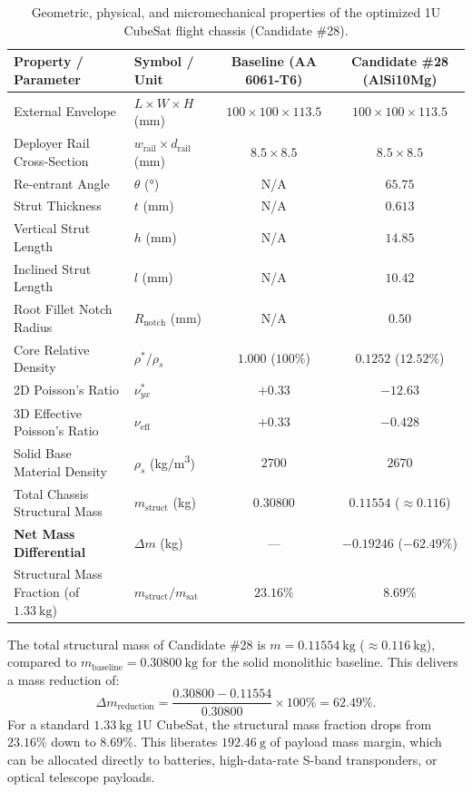 \begin{table}[htbp]
\centering
\caption{Geometric, physical, and micromechanical properties of the optimized 1U CubeSat flight chassis (Candidate \#28).}
\label{tab:candidate28_parameters}
\scriptsize
\setlength{\tabcolsep}{4pt}
\begin{tabularx}{\textwidth}{l l c c}
\toprule
\textbf{Property / Parameter} & \textbf{Symbol / Unit} & \textbf{Baseline (AA 6061-T6)} & \textbf{Candidate \#28 (AlSi10Mg)} \\
\midrule
External Envelope & $L \times W \times H$ (\si{\milli\meter}) & $100 \times 100 \times 113.5$ & $100 \times 100 \times 113.5$ \\
Deployer Rail Cross-Section & $w_{\text{rail}} \times d_{\text{rail}}$ (\si{\milli\meter}) & $8.5 \times 8.5$ & $8.5 \times 8.5$ \\
Re-entrant Angle & $\theta$ (\si{\degree}) & N/A & $65.75$ \\
Strut Thickness & $t$ (\si{\milli\meter}) & N/A & $0.613$ \\
Vertical Strut Length & $h$ (\si{\milli\meter}) & N/A & $14.85$ \\
Inclined Strut Length & $l$ (\si{\milli\meter}) & N/A & $10.42$ \\
Root Fillet Notch Radius & $R_{\text{notch}}$ (\si{\milli\meter}) & N/A & $0.50$ \\
Core Relative Density & $\rho^*/\rho_s$ & $1.000$ ($100\%$) & $0.1252$ ($12.52\%$) \\
2D Poisson's Ratio & $\nu_{yx}^*$ & $+0.33$ & $-12.63$ \\
3D Effective Poisson's Ratio & $\nu_{\text{eff}}$ & $+0.33$ & $-0.428$ \\
Solid Base Material Density & $\rho_s$ (\si{\kilo\gram/\meter^3}) & $2700$ & $2670$ \\
Total Chassis Structural Mass & $m_{\text{struct}}$ (\si{\kilo\gram}) & $0.30800$ & $\mathbf{0.11554}$ ($\approx 0.116$) \\
\textbf{Net Mass Differential} & $\Delta m$ (\si{\kilo\gram}) & --- & $\mathbf{-0.19246}$ ($\mathbf{-62.49\%}$) \\
Structural Mass Fraction (of $\SI{1.33}{\kilo\gram}$) & $m_{\text{struct}} / m_{\text{sat}}$ & $23.16\%$ & $\mathbf{8.69\%}$ \\
\bottomrule
\end{tabularx}
\end{table}

The total structural mass of Candidate \#28 is $m = \SI{0.11554}{\kilo\gram}$ ($\approx \SI{0.116}{\kilo\gram}$), compared to $m_{\text{baseline}} = \SI{0.30800}{\kilo\gram}$ for the solid monolithic baseline. This delivers a mass reduction of:
\begin{equation}
\Delta m_{\text{reduction}} = \frac{0.30800 - 0.11554}{0.30800} \times 100\% = \mathbf{62.49\%}.
\label{eq:mass_reduction}
\end{equation}
For a standard $\SI{1.33}{\kilo\gram}$ 1U CubeSat, the structural mass fraction drops from $23.16\%$ down to $8.69\%$. This liberates $\SI{192.46}{\gram}$ of payload mass margin, which can be allocated directly to batteries, high-data-rate S-band transponders, or optical telescope payloads.

